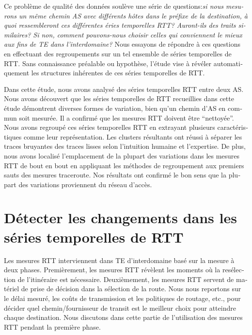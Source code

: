 \begin{otherlanguage}{french}
Ce problème de qualité des données soulève une série de questions:\textit{si nous mesurons un même chemin AS avec différents hôtes dans le préfixe de la destination, 
à quoi ressembleront ces différentes éries temporelles RTT? 
Auront-ils des traits similaires? 
Si non, comment pouvons-nous choisir celles qui conviennent le mieux aux fins de TE dans l'interdomaine?}
Nous essayons de répondre à ces questions en effectuant des regroupements sur un tel ensemble de séries temporelles de RTT.
Sans connaissance préalable ou hypothèse, l'étude vise à révéler automatiquement les structures inhérentes de ces séries temporelles de RTT.

Dans cette étude, nous avons analysé des séries temporelles RTT entre deux AS.
Nous avons découvert que les séries temporelles de RTT recueillies dans cette étude démontrent diverses formes de variation, 
bien qu'un chemin d'AS en commun soit mesurée.
Il a confirmé que les mesures RTT doivent être ``nettoyée''.
Nous avons regroupé ces séries temporelles RTT en extrayant
plusieurs caractéristiques comme leur représentation.
Les clusters résultants ont réussi à séparer les traces bruyantes des traces lisses selon l'intuition humaine et l'expertise.
De plus, nous avons localisé l'emplacement de la plupart des variations dans les mesures RTT de bout en bout en appliquant les méthodes de regroupement aux premiers sauts des mesures traceroute.
Nos résultats ont confirmé le bon sens que la plupart des variations proviennent du réseau d'accès.


\section{Détecter les changements dans les séries temporelles de RTT}

Les mesures RTT interviennent dans TE d'interdomaine basé sur la mesure à deux phases.
Premièrement, les mesures RTT révèlent les moments où la resélection de l'itinéraire est nécessaire. %
Deuxièmement, les mesures RTT servent de matériel de prise de décision dans la sélection de la route. 
Nous nous reportons sur le délai mesuré, les coûts de transmission et les politiques de routage, etc., 
pour décider quel chemin/fournisseur de transit est le meilleur choix pour atteindre chaque destination.
Nous discutons dans cette partie de l'utilisation des mesures RTT pendant la première phase.


\end{otherlanguage}
